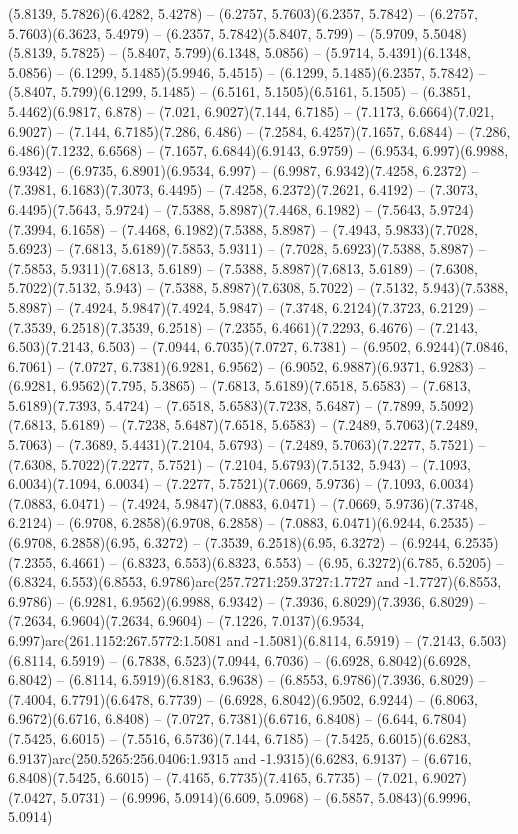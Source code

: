 (5.8139, 5.7826)(6.4282, 5.4278) -- (6.2757, 5.7603)(6.2357, 5.7842) -- (6.2757, 5.7603)(6.3623, 5.4979) -- (6.2357, 5.7842)(5.8407, 5.799) -- (5.9709, 5.5048)(5.8139, 5.7825) -- (5.8407, 5.799)(6.1348, 5.0856) -- (5.9714, 5.4391)(6.1348, 5.0856) -- (6.1299, 5.1485)(5.9946, 5.4515) -- (6.1299, 5.1485)(6.2357, 5.7842) -- (5.8407, 5.799)(6.1299, 5.1485) -- (6.5161, 5.1505)(6.5161, 5.1505) -- (6.3851, 5.4462)(6.9817, 6.878) -- (7.021, 6.9027)(7.144, 6.7185) -- (7.1173, 6.6664)(7.021, 6.9027) -- (7.144, 6.7185)(7.286, 6.486) -- (7.2584, 6.4257)(7.1657, 6.6844) -- (7.286, 6.486)(7.1232, 6.6568) -- (7.1657, 6.6844)(6.9143, 6.9759) -- (6.9534, 6.997)(6.9988, 6.9342) -- (6.9735, 6.8901)(6.9534, 6.997) -- (6.9987, 6.9342)(7.4258, 6.2372) -- (7.3981, 6.1683)(7.3073, 6.4495) -- (7.4258, 6.2372)(7.2621, 6.4192) -- (7.3073, 6.4495)(7.5643, 5.9724) -- (7.5388, 5.8987)(7.4468, 6.1982) -- (7.5643, 5.9724)(7.3994, 6.1658) -- (7.4468, 6.1982)(7.5388, 5.8987) -- (7.4943, 5.9833)(7.7028, 5.6923) -- (7.6813, 5.6189)(7.5853, 5.9311) -- (7.7028, 5.6923)(7.5388, 5.8987) -- (7.5853, 5.9311)(7.6813, 5.6189) -- (7.5388, 5.8987)(7.6813, 5.6189) -- (7.6308, 5.7022)(7.5132, 5.943) -- (7.5388, 5.8987)(7.6308, 5.7022) -- (7.5132, 5.943)(7.5388, 5.8987) -- (7.4924, 5.9847)(7.4924, 5.9847) -- (7.3748, 6.2124)(7.3723, 6.2129) -- (7.3539, 6.2518)(7.3539, 6.2518) -- (7.2355, 6.4661)(7.2293, 6.4676) -- (7.2143, 6.503)(7.2143, 6.503) -- (7.0944, 6.7035)(7.0727, 6.7381) -- (6.9502, 6.9244)(7.0846, 6.7061) -- (7.0727, 6.7381)(6.9281, 6.9562) -- (6.9052, 6.9887)(6.9371, 6.9283) -- (6.9281, 6.9562)(7.795, 5.3865) -- (7.6813, 5.6189)(7.6518, 5.6583) -- (7.6813, 5.6189)(7.7393, 5.4724) -- (7.6518, 5.6583)(7.7238, 5.6487) -- (7.7899, 5.5092)(7.6813, 5.6189) -- (7.7238, 5.6487)(7.6518, 5.6583) -- (7.2489, 5.7063)(7.2489, 5.7063) -- (7.3689, 5.4431)(7.2104, 5.6793) -- (7.2489, 5.7063)(7.2277, 5.7521) -- (7.6308, 5.7022)(7.2277, 5.7521) -- (7.2104, 5.6793)(7.5132, 5.943) -- (7.1093, 6.0034)(7.1094, 6.0034) -- (7.2277, 5.7521)(7.0669, 5.9736) -- (7.1093, 6.0034)(7.0883, 6.0471) -- (7.4924, 5.9847)(7.0883, 6.0471) -- (7.0669, 5.9736)(7.3748, 6.2124) -- (6.9708, 6.2858)(6.9708, 6.2858) -- (7.0883, 6.0471)(6.9244, 6.2535) -- (6.9708, 6.2858)(6.95, 6.3272) -- (7.3539, 6.2518)(6.95, 6.3272) -- (6.9244, 6.2535)(7.2355, 6.4661) -- (6.8323, 6.553)(6.8323, 6.553) -- (6.95, 6.3272)(6.785, 6.5205) -- (6.8324, 6.553)(6.8553, 6.9786)arc(257.7271:259.3727:1.7727 and -1.7727)(6.8553, 6.9786) -- (6.9281, 6.9562)(6.9988, 6.9342) -- (7.3936, 6.8029)(7.3936, 6.8029) -- (7.2634, 6.9604)(7.2634, 6.9604) -- (7.1226, 7.0137)(6.9534, 6.997)arc(261.1152:267.5772:1.5081 and -1.5081)(6.8114, 6.5919) -- (7.2143, 6.503)(6.8114, 6.5919) -- (6.7838, 6.523)(7.0944, 6.7036) -- (6.6928, 6.8042)(6.6928, 6.8042) -- (6.8114, 6.5919)(6.8183, 6.9638) -- (6.8553, 6.9786)(7.3936, 6.8029) -- (7.4004, 6.7791)(6.6478, 6.7739) -- (6.6928, 6.8042)(6.9502, 6.9244) -- (6.8063, 6.9672)(6.6716, 6.8408) -- (7.0727, 6.7381)(6.6716, 6.8408) -- (6.644, 6.7804)(7.5425, 6.6015) -- (7.5516, 6.5736)(7.144, 6.7185) -- (7.5425, 6.6015)(6.6283, 6.9137)arc(250.5265:256.0406:1.9315 and -1.9315)(6.6283, 6.9137) -- (6.6716, 6.8408)(7.5425, 6.6015) -- (7.4165, 6.7735)(7.4165, 6.7735) -- (7.021, 6.9027)(7.0427, 5.0731) -- (6.9996, 5.0914)(6.609, 5.0968) -- (6.5857, 5.0843)(6.9996, 5.0914) 